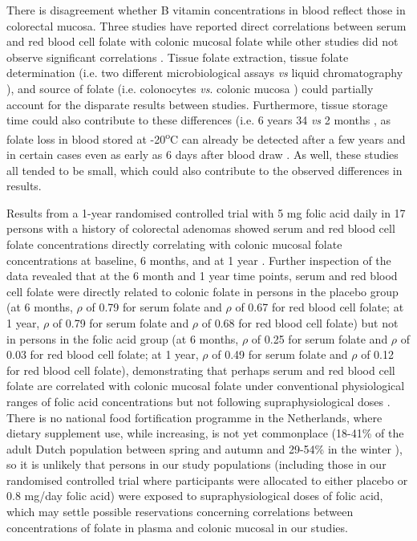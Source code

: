 \noindent There is disagreement whether B vitamin concentrations in blood reflect those in colorectal mucosa. Three studies have reported direct correlations between serum and red blood cell folate with colonic mucosal folate \cite{c735,c736,c737} while other studies did not observe significant correlations \cite{c734,c738,c739}. Tissue folate extraction, tissue folate determination (i.e. two different microbiological assays \cite{c736,c739} \emph{vs} liquid chromatography \cite{c734}), and source of folate (i.e. colonocytes \cite{c738,c739} \emph{vs}. colonic mucosa \cite{c734,c735,c736}) could partially account for the disparate results between studies. Furthermore, tissue storage time could also contribute to these differences (i.e. 6 years 34 \emph{vs} 2 months \cite{c736}, as folate loss in blood stored at -20\textsuperscript{o}C can already be detected after a few years \cite{c740,c741} and in certain cases even as early as 6 days after blood draw \cite{c742}. As well, these studies all tended to be small, which could also contribute to the observed differences in results.

\noindent Results from a 1-year randomised controlled trial with 5 mg folic acid daily in 17 persons with a history of colorectal adenomas showed serum and red blood cell folate concentrations directly correlating with colonic mucosal folate concentrations at baseline, 6 months, and at 1 year \cite{c735}. Further inspection of the data revealed that at the 6 month and 1 year time points, serum and red blood cell folate were directly related to colonic folate in persons in the placebo group (at 6 months, $\rho$ of 0.79 for serum folate and $\rho$ of 0.67 for red blood cell folate; at 1 year, $\rho$ of 0.79 for serum folate and $\rho$ of 0.68 for red blood cell folate) but not in persons in the folic acid group (at 6 months, $\rho$ of 0.25 for serum folate and $\rho$ of 0.03 for red blood cell folate; at 1 year, $\rho$ of 0.49 for serum folate and $\rho$ of 0.12 for red blood cell folate), demonstrating that perhaps serum and red blood cell folate are correlated with colonic mucosal folate under conventional physiological ranges of folic acid concentrations but not following supraphysiological doses \cite{c735}. There is no national food fortification programme in the Netherlands, where dietary supplement use, while increasing, is not yet commonplace (18-41\% of the adult Dutch population between spring and autumn and 29-54\% in the winter \cite{c720}), so it is unlikely that persons in our study populations (including those in our randomised controlled trial where participants were allocated to either placebo or 0.8 mg/day folic acid) were exposed to supraphysiological doses of folic acid, which may settle possible reservations concerning correlations between concentrations of folate in plasma and colonic mucosal in our studies.

